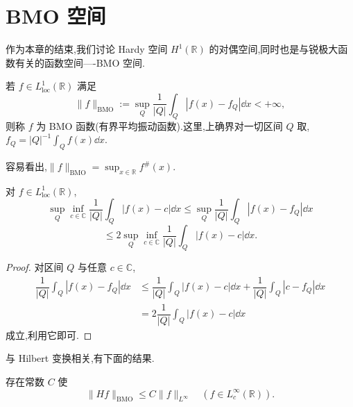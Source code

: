 \section{BMO 空间}\label{sec:1.13}


作为本章的结束,我们讨论 Hardy 空间 $H^{1}(\mathbb{R})$ 的对偶空间,同时也是与锐极大函数有关的函数空间----BMO 空间.

\begin{definition}\label{def:1.13.1}
若 $f \in L_{\mathrm{loc}}^{1}(\mathbb{R})$ 满足
\begin{equation*}
\| f \|_{\mathrm{BMO}} := \sup_{Q}\frac{1}{|Q|}\int_{Q}|f(x) - f_{Q}|\dd x < +\infty,
\end{equation*}
则称 $f$ 为 BMO 函数(有界平均振动函数).这里,上确界对一切区间 $Q$ 取,$f_{Q} = |Q|^{-1}\int_{Q}f(x)\dd x$.
\end{definition}

容易看出,$\| f \|_{\mathrm{BMO}} = \sup_{x \in \mathbb{R}}f^{\#}(x)$.

\begin{lemma}\label{lem:1.13.2}
对 $f \in L_{\mathrm{loc}}^{1}(\mathbb{R})$,
\begin{equation*}
\sup_{Q}\inf_{c \in \mathbb{C}}\frac{1}{|Q|}\int_{Q}|f(x) - c|\dd x \leq \sup_{Q}\frac{1}{|Q|}\int_{Q}|f(x) - f_{Q}|\dd x
\end{equation*}
\begin{equation*}
\leq 2\sup_{Q}\inf_{c \in \mathbb{C}}\frac{1}{|Q|}\int_{Q}|f(x) - c|\dd x.
\end{equation*}
\end{lemma}

\begin{proof}
对区间 $Q$ 与任意 $c \in \mathbb{C}$,
\begin{align*}
\dfrac{1}{|Q|}\displaystyle\int_{Q}|f(x) - f_{Q}|\dd x & \leq \dfrac{1}{|Q|}\int_{Q}|f(x) - c|\dd x + \dfrac{1}{|Q|}\int_{Q}|c - f_{Q}|\dd x \\
& = 2\dfrac{1}{|Q|}\displaystyle\int_{Q}|f(x) - c|\dd x
\end{align*}
成立,利用它即可.
\end{proof}

与 Hilbert 变换相关,有下面的结果.

\begin{theorem}\label{thm:1.13.3}
存在常数 $C$ 使
\begin{equation*}
\| Hf \|_{\mathrm{BMO}} \leq C\| f \|_{L^{\infty}} \quad (f \in L_{c}^{\infty}(\mathbb{R})).
\end{equation*}
\end{theorem}

